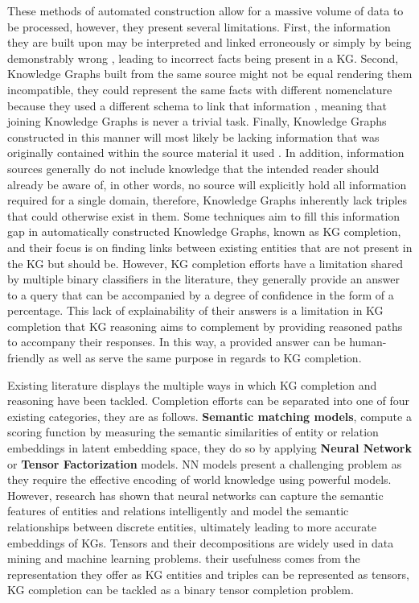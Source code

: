 These methods of automated construction allow for a massive volume of data to be processed, however, they present several limitations.
First, the information they are built upon may be interpreted and linked erroneously or simply by being demonstrably wrong \cite{martinez2020information}, leading to incorrect facts being present in a KG. 
Second, Knowledge Graphs built from the same source might not be equal rendering them incompatible, they could represent the same facts with different nomenclature because they used a different schema to link that information \cite{choi2006survey}, meaning that joining Knowledge Graphs is never a trivial task.
Finally, Knowledge Graphs constructed in this manner will most likely be lacking information that was originally contained within the source material it used \cite{bordes2014constructing}. In addition, information sources generally do not include knowledge that the intended reader should already be aware of, in other words, no source will explicitly hold all information required for a single domain, therefore, Knowledge Graphs inherently lack triples that could otherwise exist in them.
Some techniques aim to fill this information gap in automatically constructed Knowledge Graphs, known as KG completion, and their focus is on finding links between existing entities that are not present in the KG but should be. However, KG completion efforts have a limitation shared by multiple binary classifiers in the literature, they generally provide an answer to a query that can be accompanied by a degree of confidence in the form of a percentage. This lack of explainability of their answers is a limitation in KG completion that KG reasoning aims to complement by providing reasoned paths to accompany their responses. In this way, a provided answer can be human-friendly as well as serve the same purpose in regards to KG completion.

Existing literature displays the multiple ways in which KG completion and reasoning have been tackled. Completion efforts can be separated into one of four existing categories\cite{shen2022comprehensive}, they are as follows.
\textbf{Semantic matching models}, compute a scoring function by measuring the semantic similarities of entity or relation embeddings in latent embedding space, they do so by applying \textbf{Neural Network} or \textbf{Tensor Factorization} models. 
NN models \cite{} present a challenging problem as they require the effective encoding of world knowledge using powerful models. However, research has shown that neural networks can capture the semantic features of entities and relations intelligently and model the semantic relationships between discrete entities, ultimately leading to more accurate embeddings of KGs.
Tensors\cite{} and their decompositions are widely used in data mining and machine learning problems. their usefulness comes from the representation they offer as KG entities and triples can be represented as tensors, KG completion can be tackled as a binary tensor completion problem\cite{shen2022comprehensive}.

